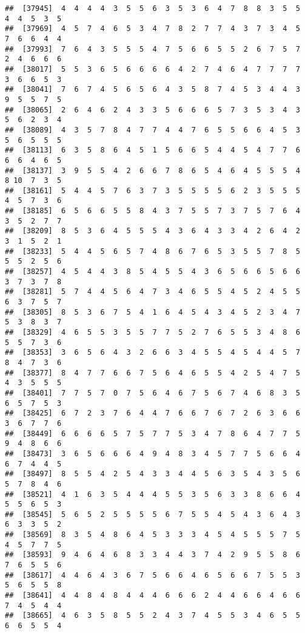 \documentclass[
]{book}
\begin{document}
\begin{verbatim}
##  [37945]  4  4  4  4  3  5  5  6  3  5  3  6  4  7  8  8  3  5  5  4  4  5  3  5
##  [37969]  4  5  7  4  6  5  3  4  7  8  2  7  7  4  3  7  3  4  5  7  6  6  4  4
##  [37993]  7  6  4  3  5  5  5  4  7  5  6  6  5  5  2  6  7  5  7  2  4  6  6  6
##  [38017]  5  5  3  6  5  6  6  6  6  4  2  7  4  6  4  7  7  7  7  3  6  6  5  3
##  [38041]  7  6  7  4  5  6  5  6  4  3  5  8  7  4  5  3  4  4  3  9  5  5  7  5
##  [38065]  2  6  4  6  2  4  3  3  5  6  6  6  5  7  3  5  3  4  3  5  6  2  3  4
##  [38089]  4  3  5  7  8  4  7  7  4  4  7  6  5  5  6  6  4  5  3  5  6  5  5  5
##  [38113]  6  3  5  8  6  4  5  1  5  6  6  5  4  4  5  4  7  7  6  6  6  4  6  5
##  [38137]  3  9  5  5  4  2  6  6  7  8  6  5  4  6  4  5  5  5  4  8 10  7  3  5
##  [38161]  5  4  4  5  7  6  3  7  3  5  5  5  5  6  2  3  5  5  5  4  5  7  3  6
##  [38185]  6  5  6  6  5  5  8  4  3  7  5  5  7  3  7  5  7  6  4  3  5  2  7  7
##  [38209]  8  5  3  6  4  5  5  5  4  3  6  4  3  3  4  2  6  4  2  3  1  5  2  1
##  [38233]  5  4  4  5  6  5  7  4  8  6  7  6  5  3  5  5  7  8  5  5  5  2  5  6
##  [38257]  4  5  4  4  3  8  5  4  5  5  4  3  6  5  6  6  5  6  6  3  7  3  7  8
##  [38281]  5  7  4  4  5  6  4  7  3  4  6  5  5  4  5  2  4  5  5  6  3  7  5  7
##  [38305]  8  5  3  6  7  5  4  1  6  4  5  4  3  4  5  2  3  4  7  5  3  8  3  7
##  [38329]  4  6  5  5  3  5  5  7  7  5  2  7  6  5  5  3  4  8  6  5  5  7  3  6
##  [38353]  3  6  5  6  4  3  2  6  6  3  4  5  5  4  5  4  4  5  7  8  4  7  3  6
##  [38377]  8  4  7  7  6  6  7  5  6  4  6  5  5  4  2  5  4  7  5  4  3  5  5  5
##  [38401]  7  7  5  7  0  7  5  6  4  6  7  5  6  7  4  6  8  3  5  6  5  7  5  3
##  [38425]  6  7  2  3  7  6  4  4  7  6  6  7  6  7  2  6  3  6  6  3  6  7  7  6
##  [38449]  6  6  6  6  5  7  5  7  7  5  3  4  7  8  6  4  7  7  5  9  4  8  6  6
##  [38473]  3  6  5  6  6  6  4  9  4  8  3  4  5  7  7  5  6  6  4  6  7  4  4  5
##  [38497]  8  5  5  4  2  5  4  3  3  4  4  5  6  3  5  4  3  5  6  5  7  8  4  6
##  [38521]  4  1  6  3  5  4  4  4  5  5  3  5  6  3  3  8  6  6  4  5  5  6  5  3
##  [38545]  5  6  5  2  5  5  5  5  6  7  5  5  4  5  4  3  6  4  3  6  3  3  5  2
##  [38569]  8  3  5  4  8  6  4  5  3  3  3  4  5  4  5  5  5  7  5  4  5  7  7  5
##  [38593]  9  4  6  4  6  8  3  3  4  4  3  7  4  2  9  5  5  8  6  7  6  5  5  6
##  [38617]  4  4  6  4  3  6  7  5  6  6  4  6  5  6  6  7  5  5  3  5  6  5  5  8
##  [38641]  4  4  8  4  8  4  4  4  6  6  6  2  4  4  6  6  4  6  6  7  4  5  4  4
##  [38665]  4  6  3  5  8  5  5  2  4  3  7  4  5  5  3  4  6  5  5  6  6  5  5  4

\end{verbatim}
\end{document}
